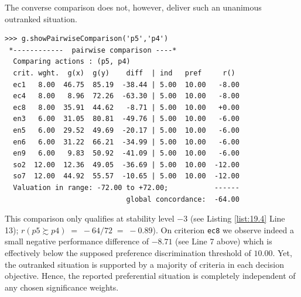 The converse comparison does not, however, deliver such an unanimous outranked situation. 
\begin{lstlisting}
>>> g.showPairwiseComparison('p5','p4')
 *------------  pairwise comparison ----*
  Comparing actions : (p5, p4)
  crit. wght.  g(x)  g(y)    diff  | ind   pref     r()
  ec1   8.00  46.75  85.19  -38.44 | 5.00  10.00   -8.00
  ec4   8.00   8.96  72.26  -63.30 | 5.00  10.00   -8.00
  ec8   8.00  35.91  44.62   -8.71 | 5.00  10.00   +0.00
  en3   6.00  31.05  80.81  -49.76 | 5.00  10.00   -6.00
  en5   6.00  29.52  49.69  -20.17 | 5.00  10.00   -6.00
  en6   6.00  31.22  66.21  -34.99 | 5.00  10.00   -6.00
  en9   6.00   9.83  50.92  -41.09 | 5.00  10.00   -6.00
  so2  12.00  12.36  49.05  -36.69 | 5.00  10.00  -12.00
  so7  12.00  44.92  55.57  -10.65 | 5.00  10.00  -12.00
  Valuation in range: -72.00 to +72.00;           ------
                             global concordance:  -64.00
\end{lstlisting}
This comparison only qualifies at stability level $-3$ (see Listing \ref{list:19.4} Line 13); $r(p5 \succsim p4)\; =\; -64/72\; =\; -0.89$). On criterion \texttt{ec8} we observe indeed a small negative performance difference of $-8.71$ (see Line 7 above) which is effectively below the supposed preference discrimination threshold of $10.00$. Yet, the outranked situation is supported by a majority of criteria in each decision objective. Hence, the reported preferential situation is completely independent of any chosen significance weights.

